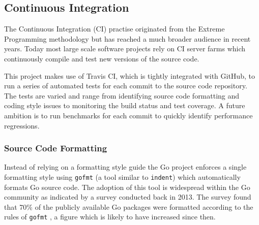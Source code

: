 


\subsection{Continuous Integration}


The Continuous Integration (CI) practise originated from the Extreme Programming methodology \cite{extreme_programming} but has reached a much broader audience in recent years. Today most large scale software projects rely on CI server farms which continuously compile and test new versions of the source code.

This project makes use of Travis CI, which is tightly integrated with GitHub, to run a series of automated tests for each commit to the source code repository. The tests are varied and range from identifying source code formatting and coding style issues to monitoring the build status and test coverage. A future ambition is to run benchmarks for each commit to quickly identify performance regressions.

\subsubsection{Source Code Formatting}

Instead of relying on a formatting style guide the Go project enforces a single formatting style using \texttt{gofmt} (a tool similar to \texttt{indent}) which automatically formats Go source code. The adoption of this tool is widespread within the Go community as indicated by a survey conducted back in 2013. The survey found that 70\% of the publicly available Go packages were formatted according to the rules of \texttt{gofmt} \cite{gofmt_70percent}, a figure which is likely to have increased since then.

